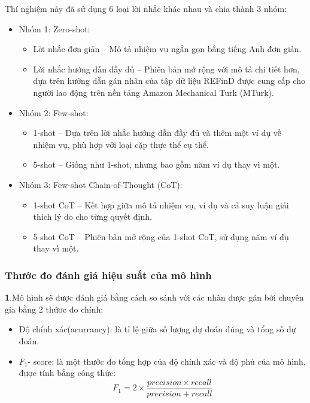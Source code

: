 \documentclass{article} %
\begin{document}
Thí nghiệm này đã sử dụng 6 loại lời nhắc khác nhau và chia thành 3 nhóm: 

\begin{itemize}
    \item Nhóm 1: Zero-shot:
    \begin{itemize}[label=-]
        \item Lời nhắc đơn giản – Mô tả nhiệm vụ ngắn gọn bằng tiếng Anh đơn giản.
        \item Lời nhắc hướng dẫn đầy đủ – Phiên bản mở rộng với mô tả chi tiết hơn, 
    dựa trên hướng dẫn gán nhãn của tập dữ liệu REFinD được cung cấp cho người lao động trên nền tảng Amazon Mechanical Turk (MTurk).
    \end{itemize}
    \item Nhóm 2: Few-shot:
    \begin{itemize}[label=-]
        \item 1-shot – Dựa trên lời nhắc hướng dẫn đầy đủ và thêm một ví dụ về nhiệm vụ, phù hợp với loại cặp thực thể cụ thể.
        \item 5-shot – Giống như 1-shot, nhưng bao gồm năm ví dụ thay vì một.
    \end{itemize}
    \item Nhóm 3: Few-shot Chain-of-Thought (CoT):
    \begin{itemize}[label=-]
        \item 1-shot CoT – Kết hợp giữa mô tả nhiệm vụ, ví dụ và cả suy luận giải thích lý do cho từng quyết định.
        \item 5-shot CoT – Phiên bản mở rộng của 1-shot CoT, sử dụng năm ví dụ thay vì một.
    \end{itemize}
\end{itemize}

\subsubsection{Thước đo đánh giá hiệu suất của mô hình}

\textbf{1}.Mô hình sẽ được đánh giá bằng cách so sánh với các nhãn được gán bởi chuyên gia bằng 2 thứơc đo chính:
\begin{itemize}
    \item Độ chính xác(acurrancy): là tỉ lệ giữa số lượng dự đoán đúng và tổng số dự đoán.
    \item $F_1$- score: là một thước đo tổng hợp của độ chính xác và độ phủ của mô hình, được tính bằng công thức: 
    \[F_1 = 2 \times \frac{precision \times recall}{precision + recall}\]
\end{itemize}
\end{document}
